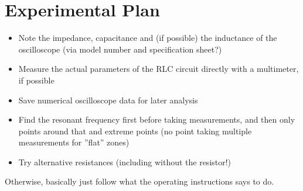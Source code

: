 \documentclass[a4paper]{scrartcl}
\begin{document}
\section{Experimental Plan}
\begin{itemize}
    \item Note the impedance, capacitance and (if possible) the inductance of the oscilloscope (via model number and specification sheet?)
    \item Measure the actual parameters of the RLC circuit directly with a multimeter, if possible
    \item Save numerical oscilloscope data for later analysis
    \item Find the resonant frequency first before taking measurements, and then only points around that and extreme points (no point taking multiple measurements for ''flat'' zones)
    \item Try alternative resistances (including without the resistor!)
\end{itemize}

Otherwise, basically just follow what the operating instructions says to do.
\end{document}
